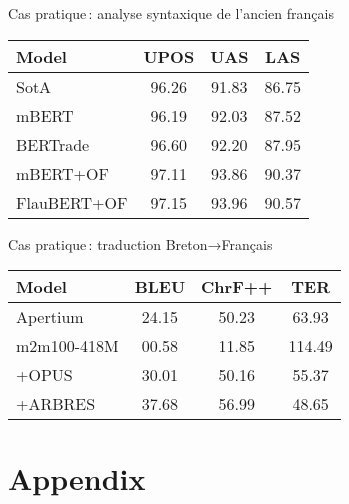 \documentclass[
	xcolor={svgnames},
	aspectratio=169,
	french,
]{beamer}
\begin{document}
\begin{frame}{Cas pratique : analyse syntaxique de l'ancien français}
	\begin{center}
		\begin{tabular}{l*{3}{S[table-format=2.2]}}
			\toprule
			{\textbf{Model}} & {\textbf{UPOS}} & {\textbf{UAS}} & {\textbf{LAS}}\\
			\midrule
			SotA & 96.26 & 91.83 & 86.75\\
			\midrule
			mBERT	& 96.19 & 92.03 & 87.52\\
			BERTrade      & 96.60 & 92.20 & 87.95\\
			mBERT+OF      & 97.11 & 93.86 & 90.37\\
			FlauBERT+OF   & 97.15 & 93.96 & 90.57\\
			\bottomrule
		\end{tabular}
	\end{center}
\end{frame}

\begin{frame}{Cas pratique : traduction Breton→Français}
	\begin{center}
		\begin{tabular}{l*{2}{S[table-format=2.2]}S[table-format=3.2]}
			\toprule
			{\textbf{Model}} & {\textbf{BLEU}} & {\textbf{ChrF++}} & {\textbf{TER}}\\
			\midrule
			Apertium            & 24.15 & 50.23 &  63.93\\
			m2m100-418M         & 00.58 & 11.85 & 114.49\\
			\quad +OPUS         & 30.01 & 50.16 &  55.37\\
			\quad\quad +ARBRES  & 37.68 & 56.99 &  48.65\\
			\bottomrule
		\end{tabular}
	\end{center}
\end{frame}



\hypersetup{bookmarksdepth=0}  %
\appendix
\hypersetup{bookmarksdepth=2}
\section{Appendix}
\end{document}

